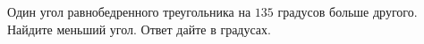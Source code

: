 \begin{ex}
	\begin{condition}
		Один угол равнобедренного треугольника на \( 135 \) градусов больше другого. Найдите меньший угол. Ответ дайте в градусах.
	\end{condition}
\end{ex}